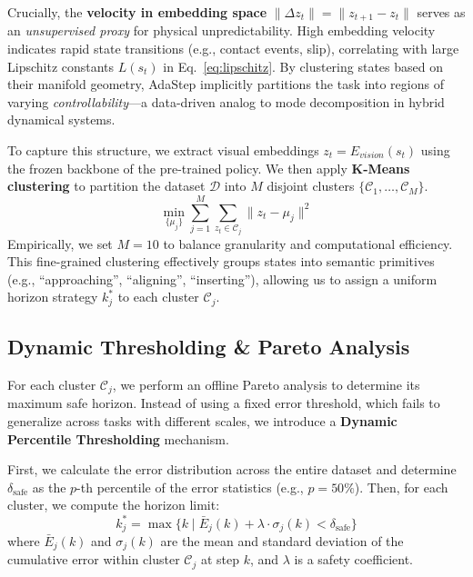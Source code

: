 \documentclass[conference]{IEEEtran}
\begin{document}
Crucially, the \textbf{velocity in embedding space} $\|\Delta z_t\| = \|z_{t+1} - z_t\|$ serves as an \emph{unsupervised proxy} for physical unpredictability. High embedding velocity indicates rapid state transitions (e.g., contact events, slip), correlating with large Lipschitz constants $L(s_t)$ in Eq.~\eqref{eq:lipschitz}. By clustering states based on their manifold geometry, AdaStep implicitly partitions the task into regions of varying \emph{controllability}---a data-driven analog to mode decomposition in hybrid dynamical systems.

To capture this structure, we extract visual embeddings $z_t = E_{vision}(s_t)$ using the frozen backbone of the pre-trained policy. We then apply \textbf{K-Means clustering} to partition the dataset $\mathcal{D}$ into $M$ disjoint clusters $\{\mathcal{C}_1, \dots, \mathcal{C}_M\}$.
\begin{equation}
\min_{\{\mu_j\}} \sum_{j=1}^M \sum_{z_t \in \mathcal{C}_j} \| z_t - \mu_j \|^2
\end{equation}
Empirically, we set $M=10$ to balance granularity and computational efficiency. This fine-grained clustering effectively groups states into semantic primitives (e.g., ``approaching'', ``aligning'', ``inserting''), allowing us to assign a uniform horizon strategy $k_j^*$ to each cluster $\mathcal{C}_j$.

\subsection{Dynamic Thresholding \& Pareto Analysis}
For each cluster $\mathcal{C}_j$, we perform an offline Pareto analysis to determine its maximum safe horizon. Instead of using a fixed error threshold, which fails to generalize across tasks with different scales, we introduce a \textbf{Dynamic Percentile Thresholding} mechanism.

First, we calculate the error distribution across the entire dataset and determine $\delta_{\text{safe}}$ as the $p$-th percentile of the error statistics (e.g., $p=50\%$). Then, for each cluster, we compute the horizon limit:
\begin{equation}
k_j^* = \max \{ k \mid \bar{E}_j(k) + \lambda \cdot \sigma_j(k) < \delta_{\text{safe}} \}
\end{equation}
where $\bar{E}_j(k)$ and $\sigma_j(k)$ are the mean and standard deviation of the cumulative error within cluster $\mathcal{C}_j$ at step $k$, and $\lambda$ is a safety coefficient.
\end{document}
